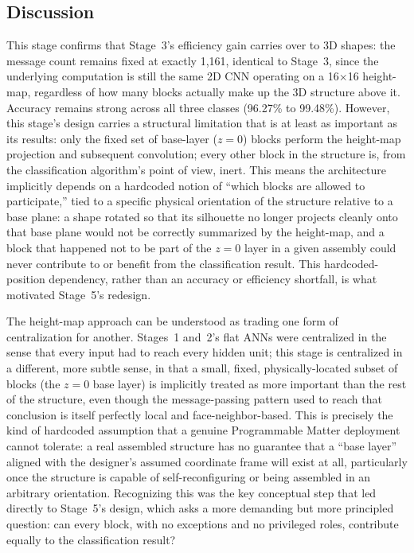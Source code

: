 \documentclass[12pt,a4paper]{report}
\begin{document}
\subsection*{Discussion}

This stage confirms that Stage~3's efficiency gain carries over to 3D shapes: the message count remains fixed at exactly 1,161, identical to Stage~3, since the underlying computation is still the same 2D CNN operating on a 16$\times$16 height-map, regardless of how many blocks actually make up the 3D structure above it. Accuracy remains strong across all three classes (96.27\% to 99.48\%). However, this stage's design carries a structural limitation that is at least as important as its results: only the fixed set of base-layer ($z=0$) blocks perform the height-map projection and subsequent convolution; every other block in the structure is, from the classification algorithm's point of view, inert. This means the architecture implicitly depends on a hardcoded notion of ``which blocks are allowed to participate,'' tied to a specific physical orientation of the structure relative to a base plane: a shape rotated so that its silhouette no longer projects cleanly onto that base plane would not be correctly summarized by the height-map, and a block that happened not to be part of the $z=0$ layer in a given assembly could never contribute to or benefit from the classification result. This hardcoded-position dependency, rather than an accuracy or efficiency shortfall, is what motivated Stage~5's redesign.

The height-map approach can be understood as trading one form of centralization for another. Stages~1 and~2's flat ANNs were centralized in the sense that every input had to reach every hidden unit; this stage is centralized in a different, more subtle sense, in that a small, fixed, physically-located subset of blocks (the $z=0$ base layer) is implicitly treated as more important than the rest of the structure, even though the message-passing pattern used to reach that conclusion is itself perfectly local and face-neighbor-based. This is precisely the kind of hardcoded assumption that a genuine Programmable Matter deployment cannot tolerate: a real assembled structure has no guarantee that a ``base layer'' aligned with the designer's assumed coordinate frame will exist at all, particularly once the structure is capable of self-reconfiguring or being assembled in an arbitrary orientation. Recognizing this was the key conceptual step that led directly to Stage~5's design, which asks a more demanding but more principled question: can every block, with no exceptions and no privileged roles, contribute equally to the classification result?
\end{document}
